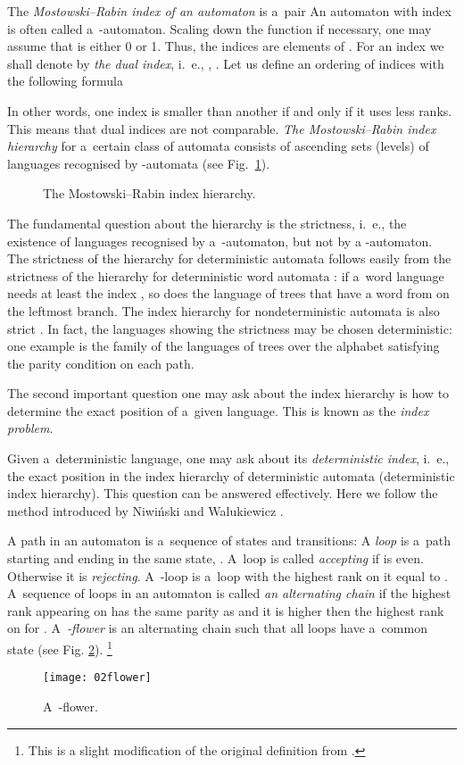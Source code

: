 \documentclass{LMCS}
\begin{document}
The {\em Mostowski--Rabin index of an automaton}  is a~pair  An automaton with index  is often called a~-automaton. Scaling down the  function if necessary, one may assume that  is either 0 or 1. Thus, the indices are elements of . For an index  we shall denote by  {\em the dual index}, i.~e., , .
Let us define an ordering of indices with the following formula

In other words, one index is smaller than another if and only if it uses less ranks. This means that dual indices are not comparable. 
 {\em The Mostowski--Rabin index hierarchy} for a~certain class of automata consists of ascending sets (levels) of languages recognised by -automata (see Fig.~\ref{fig:indexhierarchy}). 

\begin{figure}
\centering
{\setlength\arraycolsep{1pt}
}
\caption{The Mostowski--Rabin index hierarchy.}
\label{fig:indexhierarchy}
\end{figure}

The fundamental question about the hierarchy is the strictness, i.~e., the existence of languages recognised by a~-automaton, but not by a -automaton. The strictness of the hierarchy for deterministic automata follows easily from the strictness of the hierarchy for deterministic word automata \cite{wagner}: if a~word language  needs at least the index , so does the language of trees that have a word from  on the leftmost branch. The index hierarchy for nondeterministic automata is also strict \cite{klony}. In fact, the languages showing the strictness may be chosen deterministic: one example is the family of the languages of trees over the alphabet  satisfying the parity condition on each path.

The second important question one may ask about the index hierarchy is how to determine the exact position of a~given language. This is known as the {\em index problem}.

Given a~deterministic language, one may ask about its {\em deterministic index}, i.~e., the exact position in the index hierarchy of deterministic automata (deterministic index hierarchy). This question can be answered effectively. Here we follow the method introduced by Niwi{\'n}ski and Walu\-kiewicz \cite{kwiatek}. 

A path in an automaton is a~sequence of states and transitions: 
A {\em loop}  is a~path starting and ending in the same state, . A~loop  is called {\em accepting}  if  is even. Otherwise it is {\em rejecting}. A~-loop is a~loop with the highest rank on it equal to . A~sequence of loops  in an automaton is called {\em an alternating chain} if the highest rank appearing on  has the same parity as  and it is higher then the highest rank on  for . A~{\em -flower}  is an alternating chain  such that all loops have a~common state  (see Fig. \ref{fig:02flower}). \footnote{This is a slight modification of the original definition from \cite{kwiatek}.} 
\begin{figure}
\centering
\texttt{[image: 02flower]}
\caption{A~-flower.}
\label{fig:02flower}
\end{figure}
\end{document}
